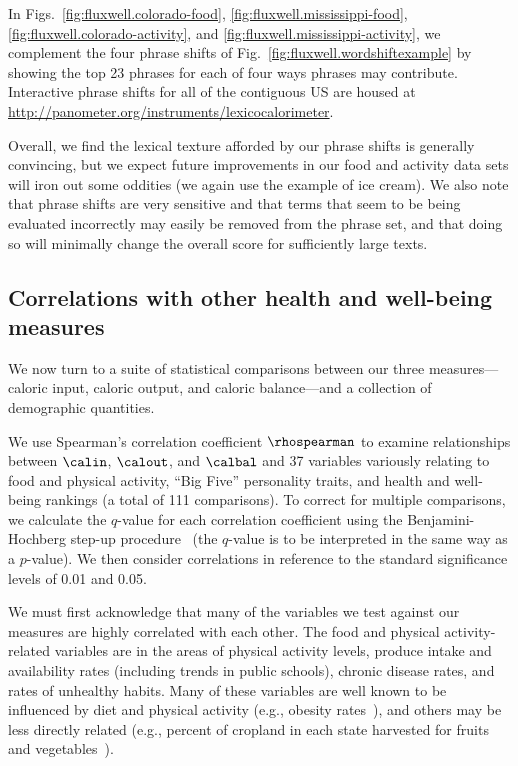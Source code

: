 In Figs.~\ref{fig:fluxwell.colorado-food},
\ref{fig:fluxwell.mississippi-food},
\ref{fig:fluxwell.colorado-activity},
and
\ref{fig:fluxwell.mississippi-activity},
we complement the four phrase shifts
of Fig.~\ref{fig:fluxwell.wordshiftexample}
by showing the top 23 phrases for 
each of four ways phrases may contribute.
Interactive phrase shifts for all of the contiguous US are housed
at \url{http://panometer.org/instruments/lexicocalorimeter}.

Overall, we find the lexical texture afforded by our phrase shifts 
is generally convincing,
but we expect future improvements in our food and activity data sets
will iron out some oddities (we again use the example of ice cream).
We also note that phrase shifts are very sensitive and
that terms that seem to be being evaluated incorrectly
may easily be removed from the phrase set, and that
doing so will minimally change the overall score for
sufficiently large texts.

\subsection*{Correlations with other health and well-being measures}
\label{subsec:fluxwell.othermeasures}



We now turn to a suite of statistical comparisons
between our three measures---caloric input, caloric output,
and caloric balance---and a collection of demographic quantities.

We use Spearman's correlation coefficient $\rhospearman$ to examine relationships between 
$\calin$, $\calout$, and $\calbal$ and 37 variables
variously relating to food and physical activity, 
``Big Five'' personality traits,
and health and well-being rankings (a total of 111 comparisons).
To correct for multiple comparisons, we calculate the
$q$-value for each correlation coefficient using the
Benjamini-Hochberg step-up procedure~\cite{benjamini1995}
(the $q$-value is to be interpreted in the same way as a $p$-value).
We then consider correlations in reference
to the standard significance levels of 0.01 and 0.05.

We must first acknowledge that many of the variables we test 
against our measures are highly correlated with each other.
The food and physical activity-related variables are in the areas of
physical activity levels, produce intake and availability rates
(including trends in public schools), chronic disease rates, and rates
of unhealthy habits.  
Many of these variables are well known to be
influenced by diet and physical activity (e.g., obesity
rates~\cite{cdc}), 
and others may be less directly related (e.g., percent of
cropland in each state harvested for fruits and
vegetables~\cite{produce}).  

